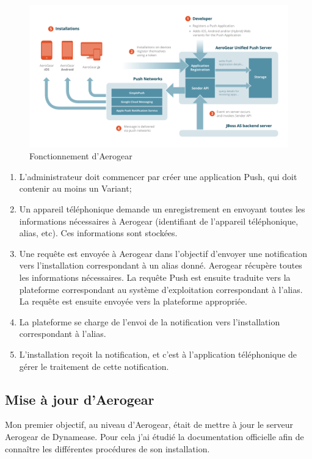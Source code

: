 \begin{figure}[!h]
	\includegraphics[scale=0.6]{img/aerogear_unified_push_server.png}
	\caption{\label{aerogear} Fonctionnement d'Aerogear}
\end{figure}


\begin{enumerate}
	\item L'administrateur doit commencer par créer une application Push, qui doit contenir au moins un Variant;
	\item Un appareil téléphonique demande un enregistrement en envoyant toutes les informations nécessaires à Aerogear (identifiant de l'appareil téléphonique, alias, etc). Ces informations sont stockées.
	\item Une requête est envoyée à Aerogear dans l'objectif d'envoyer une notification vers l'installation correspondant à un alias donné. Aerogear récupère toutes les informations nécessaires. La requête Push est ensuite traduite vers la plateforme correspondant au système d'exploitation correspondant à l'alias. La requête est ensuite envoyée vers la plateforme appropriée.
	\item La plateforme se charge de l'envoi de la notification vers l'installation correspondant à l'alias.
	\item L'installation reçoit la notification, et c'est à l'application téléphonique de gérer le traitement de cette notification.
\end{enumerate}

\subsection{Mise à jour d'Aerogear}

Mon premier objectif, au niveau d'Aerogear, était de mettre à jour le serveur Aerogear de Dynamease. Pour cela j'ai étudié la documentation officielle afin de connaître les différentes procédures de son installation.

